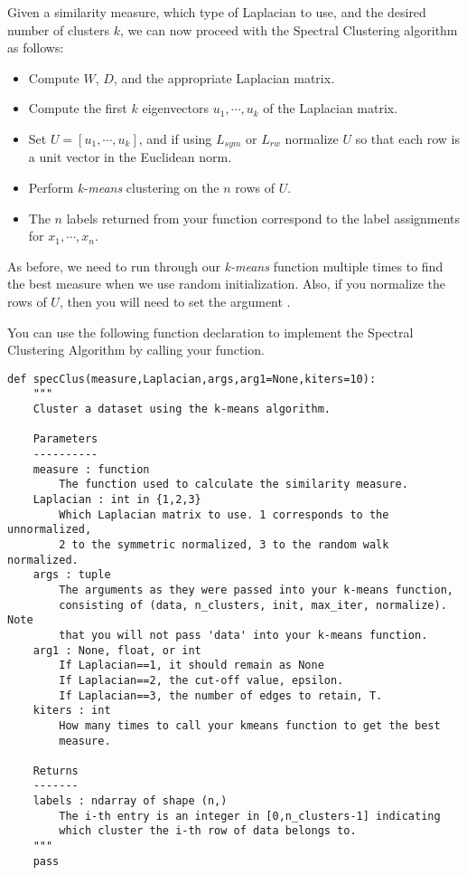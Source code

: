 Given a similarity measure, which type of Laplacian to use, and the desired number of clusters $k$, we can now proceed with the Spectral Clustering algorithm as follows:

\begin{itemize}
    \item Compute $W$, $D$, and the appropriate Laplacian matrix.
    \item Compute the first $k$ eigenvectors $u_1, \cdots , u_k$ of the Laplacian matrix.
    \item Set $U = [u_1, \cdots , u_k]$, and if using $L_{sym}$ or $L_{rw}$ normalize $U$ so that each row is a unit vector in the Euclidean norm.
    \item Perform \emph{k-means} clustering on the $n$ rows of $U$.
    \item The $n$ labels returned from your  function correspond to the label assignments for $x_1, \cdots, x_n$.
\end{itemize}

As before, we need to run through our \emph{k-means} function multiple times to find the best measure when we use random initialization.  Also, if you normalize the rows of $U$, then you will need to set the argument .

You can use the following function declaration to implement the Spectral Clustering Algorithm by calling your  function.
\begin{lstlisting}
def specClus(measure,Laplacian,args,arg1=None,kiters=10):
    """
    Cluster a dataset using the k-means algorithm.

    Parameters
    ----------
    measure : function
        The function used to calculate the similarity measure.
    Laplacian : int in {1,2,3}
        Which Laplacian matrix to use. 1 corresponds to the unnormalized,
        2 to the symmetric normalized, 3 to the random walk normalized.
    args : tuple
        The arguments as they were passed into your k-means function,
        consisting of (data, n_clusters, init, max_iter, normalize). Note
        that you will not pass 'data' into your k-means function.
    arg1 : None, float, or int
        If Laplacian==1, it should remain as None
        If Laplacian==2, the cut-off value, epsilon.
        If Laplacian==3, the number of edges to retain, T.
    kiters : int
        How many times to call your kmeans function to get the best
        measure.

    Returns
    -------
    labels : ndarray of shape (n,)
        The i-th entry is an integer in [0,n_clusters-1] indicating
        which cluster the i-th row of data belongs to.
    """
    pass
\end{lstlisting}

